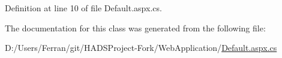 Definition at line 10 of file Default.\+aspx.\+cs.



The documentation for this class was generated from the following file\+:\begin{DoxyCompactItemize}
\item 
D\+:/\+Users/\+Ferran/git/\+H\+A\+D\+S\+Project-\/\+Fork/\+Web\+Application/\mbox{\hyperlink{Default_8aspx_8cs}{Default.\+aspx.\+cs}}\end{DoxyCompactItemize}
